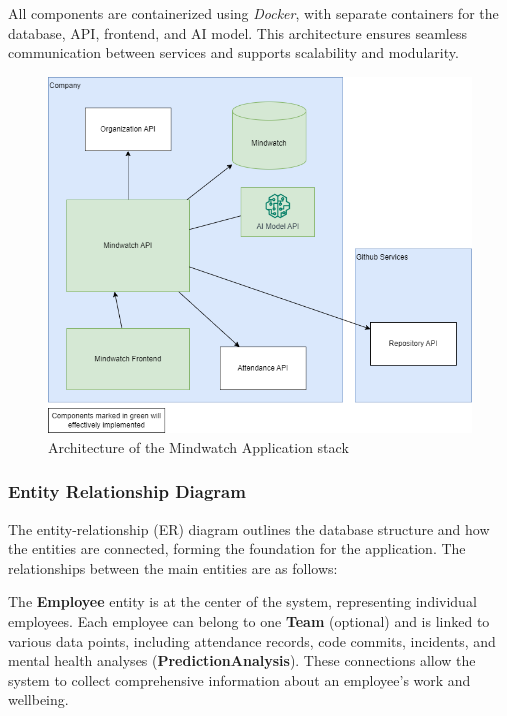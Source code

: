 \documentclass[conference]{IEEEtran}
\begin{document}
                \noindent All components are containerized using \textit{Docker}, with separate containers for the database, API, frontend, and AI model. This architecture ensures seamless communication between services and supports scalability and modularity.
                
                \begin{figure}
                    \centering
                    \includegraphics[width=1\linewidth]{DiagramArchitecture.drawio.png}
                    \caption{Architecture of the Mindwatch Application stack}
                    \label{}
                \end{figure}

            \subsubsection{Entity Relationship Diagram}

                The entity-relationship (ER) diagram outlines the database structure and how the entities are connected, forming the foundation for the application. The relationships between the main entities are as follows:
                
                The \textbf{Employee} entity is at the center of the system, representing individual employees. Each employee can belong to one \textbf{Team} (optional) and is linked to various data points, including attendance records, code commits, incidents, and mental health analyses (\textbf{PredictionAnalysis}). These connections allow the system to collect comprehensive information about an employee’s work and wellbeing.
                
\end{document}
